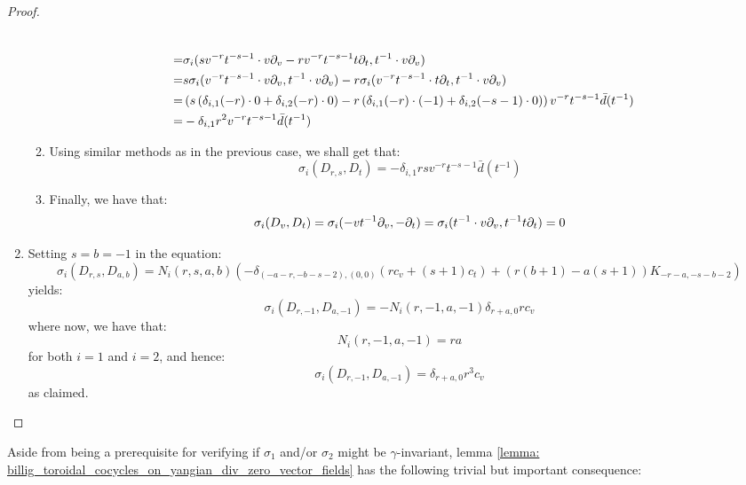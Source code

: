 \begin{proof}
\begin{enumerate}
\begin{enumerate}
$$\begin{aligned}
                                    \\
                                    = & \sigma_i( s v^{-r} t^{-s - 1} \cdot v \partial_v - r v^{-r} t^{-s - 1} t \partial_t, t^{-1} \cdot v \partial_v )
                                    \\
                                    = & s \sigma_i( v^{-r} t^{-s - 1} \cdot v \partial_v, t^{-1} \cdot v \partial_v ) - r\sigma_i( v^{-r} t^{-s - 1} \cdot t \partial_t, t^{-1} \cdot v \partial_v )
                                    \\
                                    = & \left( s \left( \delta_{i, 1} (-r) \cdot 0 + \delta_{i, 2} (-r) \cdot 0 \right) - r\left( \delta_{i, 1} (-r) \cdot (-1) + \delta_{i, 2} (-s - 1) \cdot 0 \right) \right) v^{-r} t^{-s - 1} \bar{d}(t^{-1}) 
                                    \\
                                    = & -\delta_{i, 1} r^2 v^{-r} t^{-s - 1} \bar{d}(t^{-1})
                                \end{aligned}
                            $$
                        \item Using similar methods as in the previous case, we shall get that:
                            $$\sigma_i(D_{r, s}, D_t) = -\delta_{i, 1} rs v^{-r} t^{-s - 1} \bar{d}(t^{-1})$$
                        \item Finally, we have that:
                            $$\sigma_i(D_v, D_t) = \sigma_i(-v t^{-1} \partial_v, -\partial_t) = \sigma_i(t^{-1} \cdot v \partial_v, t^{-1} t \partial_t) = 0$$
                    \end{enumerate}
                    \item Setting $s = b = -1$ in the equation:
                        $$\sigma_i(D_{r, s}, D_{a, b}) = N_i(r, s, a, b) \left( -\delta_{ (-a - r, -b - s - 2), (0, 0) } (r c_v + (s + 1) c_t) + ( r(b + 1) - a(s + 1) )K_{-r - a, -s - b - 2} \right)$$
                    yields:
                        $$\sigma_i(D_{r, -1}, D_{a, -1}) = -N_i(r, -1, a, -1) \delta_{r + a, 0} r c_v$$
                    where now, we have that:
                        $$N_i(r, -1, a, -1) = ra$$
                    for both $i = 1$ and $i = 2$, and hence:
                        $$\sigma_i(D_{r, -1}, D_{a, -1}) = \delta_{r + a, 0} r^3 c_v$$
                    as claimed.
                \end{enumerate}
            \end{proof}
        Aside from being a prerequisite for verifying if $\sigma_1$ and/or $\sigma_2$ might be $\gamma$-invariant, lemma \ref{lemma: billig_toroidal_cocycles_on_yangian_div_zero_vector_fields} has the following trivial but important consequence:
